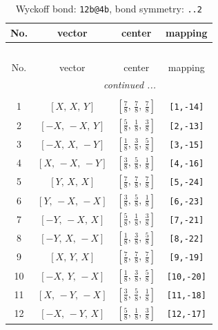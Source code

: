 \documentclass[fleqn,8pt]{jsarticle}
\begin{document}
\renewcommand{\arraystretch}{1.2}
\begin{longtable}{cccc}
\caption{Wyckoff bond: {\tt 12b@4b}, bond symmetry: {\tt ..2}}
 \\
 \hline \hline
No. & vector & center & mapping \\ \hline \endfirsthead

\multicolumn{3}{l}{\tablename\ \thetable{}} \\
 \hline \hline
No. & vector & center & mapping \\ \hline \endhead

 \hline \hline
\multicolumn{3}{r}{\footnotesize\it continued ...} \\ \endfoot

 \hline \hline
\multicolumn{3}{r}{} \\ \endlastfoot

1 & $\left[ X,\, X,\, Y \right]$ & $\left[ \frac{7}{8},\, \frac{7}{8},\, \frac{7}{8} \right]$ & {\tt [1,-14]} \\ \hline
2 & $\left[ - X,\, - X,\, Y \right]$ & $\left[ \frac{5}{8},\, \frac{1}{8},\, \frac{3}{8} \right]$ & {\tt [2,-13]} \\ \hline
3 & $\left[ - X,\, X,\, - Y \right]$ & $\left[ \frac{1}{8},\, \frac{3}{8},\, \frac{5}{8} \right]$ & {\tt [3,-15]} \\ \hline
4 & $\left[ X,\, - X,\, - Y \right]$ & $\left[ \frac{3}{8},\, \frac{5}{8},\, \frac{1}{8} \right]$ & {\tt [4,-16]} \\ \hline
5 & $\left[ Y,\, X,\, X \right]$ & $\left[ \frac{7}{8},\, \frac{7}{8},\, \frac{7}{8} \right]$ & {\tt [5,-24]} \\ \hline
6 & $\left[ Y,\, - X,\, - X \right]$ & $\left[ \frac{3}{8},\, \frac{5}{8},\, \frac{1}{8} \right]$ & {\tt [6,-23]} \\ \hline
7 & $\left[ - Y,\, - X,\, X \right]$ & $\left[ \frac{5}{8},\, \frac{1}{8},\, \frac{3}{8} \right]$ & {\tt [7,-21]} \\ \hline
8 & $\left[ - Y,\, X,\, - X \right]$ & $\left[ \frac{1}{8},\, \frac{3}{8},\, \frac{5}{8} \right]$ & {\tt [8,-22]} \\ \hline
9 & $\left[ X,\, Y,\, X \right]$ & $\left[ \frac{7}{8},\, \frac{7}{8},\, \frac{7}{8} \right]$ & {\tt [9,-19]} \\ \hline
10 & $\left[ - X,\, Y,\, - X \right]$ & $\left[ \frac{1}{8},\, \frac{3}{8},\, \frac{5}{8} \right]$ & {\tt [10,-20]} \\ \hline
11 & $\left[ X,\, - Y,\, - X \right]$ & $\left[ \frac{3}{8},\, \frac{5}{8},\, \frac{1}{8} \right]$ & {\tt [11,-18]} \\ \hline
12 & $\left[ - X,\, - Y,\, X \right]$ & $\left[ \frac{5}{8},\, \frac{1}{8},\, \frac{3}{8} \right]$ & {\tt [12,-17]} \\
\end{longtable}
\end{document}
